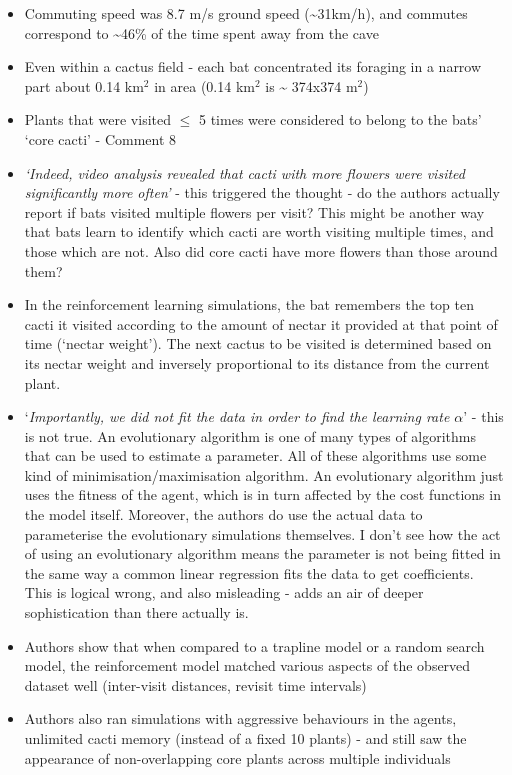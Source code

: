 \documentclass[
]{book}
\begin{document}
\begin{itemize}
\item
  Commuting speed was 8.7 m/s ground speed (\textasciitilde31km/h), and commutes correspond to \textasciitilde46\% of the time spent away from the cave
\item
  Even within a cactus field - each bat concentrated its foraging in a narrow part about 0.14 km\(^{2}\) in area (0.14 km\(^{2}\) is \textasciitilde{} 374x374 m\(^{2}\))
\item
  Plants that were visited \(\leq\) 5 times were considered to belong to the bats' `core cacti' - Comment 8
\item
  \emph{`Indeed, video analysis revealed that cacti with more flowers were visited significantly more often'} - this triggered the thought - do the authors actually report if bats visited multiple flowers per visit? This might be another way that bats learn to identify which cacti are worth visiting multiple times, and those which are not. Also did core cacti have more flowers than those around them?
\item
  In the reinforcement learning simulations, the bat remembers the top ten cacti it visited according to the amount of nectar it provided at that point of time (`nectar weight'). The next cactus to be visited is determined based on its nectar weight and inversely proportional to its distance from the current plant.
\item
  `\emph{Importantly, we did not fit the data in order to find the learning rate \(\alpha\)}' - this is not true. An evolutionary algorithm is one of many types of algorithms that can be used to estimate a parameter. All of these algorithms use some kind of minimisation/maximisation algorithm. An evolutionary algorithm just uses the fitness of the agent, which is in turn affected by the cost functions in the model itself. Moreover, the authors do use the actual data to parameterise the evolutionary simulations themselves. I don't see how the act of using an evolutionary algorithm means the parameter is not being fitted in the same way a common linear regression fits the data to get coefficients. This is logical wrong, and also misleading - adds an air of deeper sophistication than there actually is.
\item
  Authors show that when compared to a trapline model or a random search model, the reinforcement model matched various aspects of the observed dataset well (inter-visit distances, revisit time intervals)
\item
  Authors also ran simulations with aggressive behaviours in the agents, unlimited cacti memory (instead of a fixed 10 plants) - and still saw the appearance of non-overlapping core plants across multiple individuals

\end{itemize}
\end{document}
